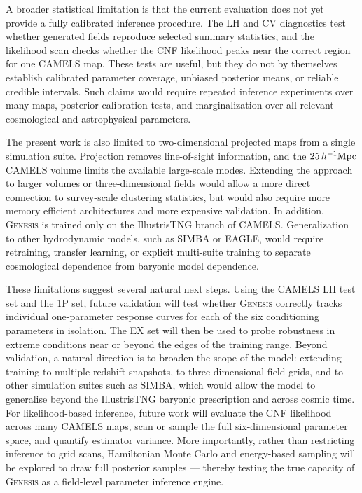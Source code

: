 \documentclass{article}
\begin{document}
A broader statistical limitation is that the current evaluation does
not yet provide a fully calibrated inference procedure. The LH and CV
diagnostics test whether generated fields reproduce selected summary
statistics, and the likelihood scan checks whether the CNF likelihood
peaks near the correct region for one CAMELS map. These tests are
useful, but they do not by themselves establish calibrated parameter
coverage, unbiased posterior means, or reliable credible intervals.
Such claims would require repeated inference experiments over many
maps, posterior calibration tests, and marginalization over all relevant
cosmological and astrophysical parameters.

The present work is also limited to two-dimensional projected maps
from a single simulation suite. Projection removes line-of-sight
information, and the $25\,h^{-1}{\rm Mpc}$ CAMELS volume limits the
available large-scale modes. Extending the approach to larger volumes
or three-dimensional fields would allow a more direct connection to
survey-scale clustering statistics, but would also require more memory
efficient architectures and more expensive validation. In addition,
\textsc{Genesis} is trained only on the IllustrisTNG branch of CAMELS.
Generalization to other hydrodynamic models, such as SIMBA or EAGLE,
would require retraining, transfer learning, or explicit multi-suite
training to separate cosmological dependence from baryonic model
dependence.

These limitations suggest several natural next steps. Using the CAMELS
LH test set and the 1P set, future validation will test whether
\textsc{Genesis} correctly tracks individual one-parameter response
curves for each of the six conditioning parameters in isolation. The EX set will then be
used to probe robustness in extreme conditions near or beyond the
edges of the training range. Beyond validation, a natural direction is
to broaden the scope of the model: extending training to multiple
redshift snapshots, to three-dimensional field grids, and to other
simulation suites such as SIMBA, which would allow the model to
generalise beyond the IllustrisTNG baryonic prescription and across
cosmic time. For likelihood-based inference, future work will evaluate
the CNF likelihood across many CAMELS maps, scan or sample the full
six-dimensional parameter space, and quantify estimator variance.
More importantly, rather than restricting inference to grid scans,
Hamiltonian Monte Carlo and energy-based sampling will be explored
to draw full posterior samples --- thereby testing the true capacity
of \textsc{Genesis} as a field-level parameter inference engine.
\end{document}
